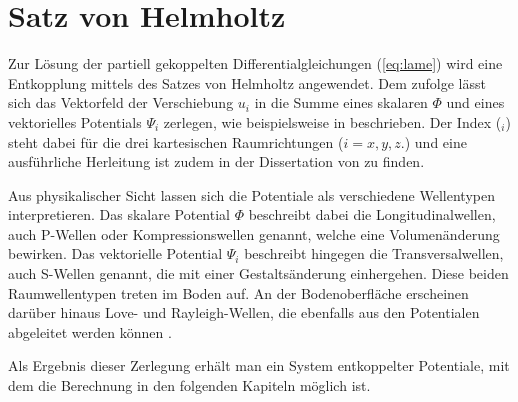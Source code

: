 \section{Satz von Helmholtz}
\label{sec:Helmholtz}
Zur Lösung der partiell gekoppelten Differentialgleichungen (\ref{eq:lame}) wird eine Entkopplung mittels des Satzes von Helmholtz angewendet.
Dem zufolge lässt sich das Vektorfeld der Verschiebung \(u_i \) in die Summe eines skalaren $\Phi$ und eines  vektorielles Potentials $\Psi_{i}$ zerlegen, wie beispielsweise in \cite{Mueller2007} beschrieben.
Der Index (\({}_i\)) steht dabei für die drei kartesischen Raumrichtungen (\( i = x, y, z.\)) und eine ausführliche Herleitung ist zudem in der Dissertation von \cite{Fruehe2010} zu finden.

Aus physikalischer Sicht lassen sich die Potentiale als verschiedene Wellentypen interpretieren.
Das skalare Potential $\Phi$ beschreibt dabei die Longitudinalwellen, auch P-Wellen oder Kompressionswellen genannt, welche eine Volumenänderung bewirken.
Das vektorielle Potential $\Psi_{i}$ beschreibt hingegen die Transversalwellen, auch S-Wellen genannt, die mit einer Gestaltsänderung einhergehen. Diese beiden Raumwellentypen treten im Boden auf.
An der Bodenoberfläche erscheinen darüber hinaus Love- und Rayleigh-Wellen, die ebenfalls aus den Potentialen abgeleitet werden können \citep{Haupt1986}.

Als Ergebnis dieser Zerlegung erhält man ein System entkoppelter Potentiale, mit dem die Berechnung in den folgenden Kapiteln möglich ist.







